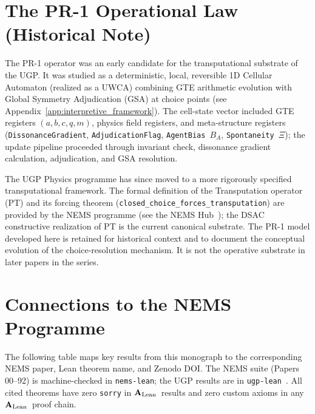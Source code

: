 \documentclass[12pt]{article}
\numberwithin{equation}{section}
\newcommand{\CatAL}{\ensuremath{\textbf{A}_{\rm Lean}}}
\begin{document}

\section{The PR-1 Operational Law (Historical Note)}
\label{app:pr1_spec}

The PR-1 operator was an early candidate for the transputational substrate of the UGP. It was studied as a deterministic, local, reversible 1D Cellular Automaton (realized as a UWCA) combining GTE arithmetic evolution with Global Symmetry Adjudication (GSA) at choice points (see Appendix~\ref{app:interpretive_framework}). The cell-state vector included GTE registers $(a,b,c,q,m)$, physics field registers, and meta-structure registers (\texttt{DissonanceGradient}, \texttt{AdjudicationFlag}, \texttt{AgentBias~$B_A$}, \texttt{Spontaneity~$\Xi$}); the update pipeline proceeded through invariant check, dissonance gradient calculation, adjudication, and GSA resolution.

The UGP Physics programme has since moved to a more rigorously specified transputational framework. The formal definition of the Transputation operator (PT) and its forcing theorem (\texttt{closed\_choice\_forces\_transputation}) are provided by the NEMS programme (see the NEMS Hub~\cite{SpivackNEMSHub}); the DSAC constructive realization of PT is the current canonical substrate. The PR-1 model developed here is retained for historical context and to document the conceptual evolution of the choice-resolution mechanism. It is not the operative substrate in later papers in the series.

\section{Connections to the NEMS Programme}\label{app:nems-table}

The following table maps key results from this monograph to the corresponding NEMS paper, Lean theorem name, and Zenodo DOI. The NEMS suite (Papers 00--92) is machine-checked in \texttt{nems-lean}; the UGP results are in \texttt{ugp-lean}~\cite{SpivackUGPFormalization,ugp-lean}. All cited theorems have zero \texttt{sorry} in \CatAL\ results and zero custom axioms in any \CatAL\ proof chain.
\end{document}
